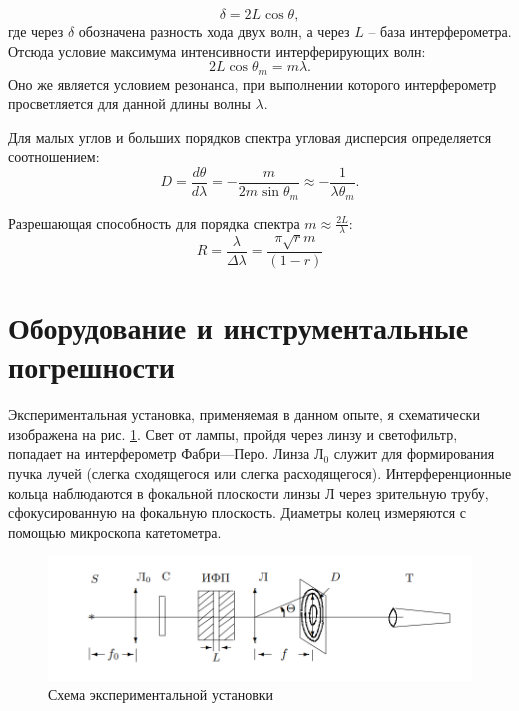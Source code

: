 \documentclass[12pt,a4paper]{extreport}
\begin{document}
\begin{equation*}\label{key}
	\delta = 2 L \cos \theta,
\end{equation*}
где через $ \delta $ обозначена разность хода двух волн, а через $ L $ -- база интерферометра. Отсюда условие максимума интенсивности интерферирующих волн:
\begin{equation*}\label{key}
	2 L \cos \theta_m = m \lambda.
\end{equation*}
Оно же является условием резонанса, при выполнении которого интерферометр просветляется для данной длины волны $ \lambda $.

Для малых углов и больших порядков спектра угловая дисперсия определяется соотношением:
\begin{equation*}\label{key}
	D = \frac{d \theta}{d \lambda} = - \frac{m}{2 m \sin \theta_m} \approx - \frac{1}{\lambda \theta_m}.
\end{equation*}

Разрешающая способность для порядка спектра $ m \approx \frac{2 L}{\lambda} $:
\begin{equation*}\label{key}
	R = \frac{\lambda}{\Delta \lambda}= \frac{\pi\sqrt{r} m }{(1-r)}
\end{equation*}

\section{Оборудование и инструментальные погрешности}

Экспериментальная установка, применяемая в данном опыте, я	схематически изображена на рис. \ref{fig:scheme}. Свет от лампы, пройдя через линзу и светофильтр, попадает на интерферометр Фабри—Перо. Линза $ Л_0 $ служит для формирования пучка лучей (слегка сходящегося или слегка расходящегося). Интерференционные кольца наблюдаются в фокальной плоскости линзы Л через зрительную трубу, сфокусированную на фокальную плоскость. Диаметры колец измеряются с помощью микроскопа катетометра.

\begin{figure}[!h]
	\centering
	\includegraphics[width=0.8\linewidth]{Screenshot_3}
	\caption{Схема экспериментальной установки}
	\label{fig:scheme}
\end{figure}
\end{document}
